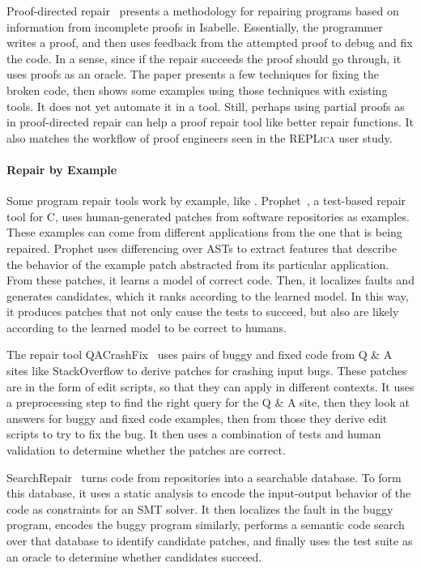 Proof-directed repair~\cite{dennis2006proof} presents a methodology
for repairing programs based on information from incomplete proofs in Isabelle.
Essentially, the programmer writes a proof, and then uses feedback
from the attempted proof to debug and fix the code.
In a sense, since if the repair succeeds the proof should go through,
it uses proofs as an oracle. The paper presents a few techniques for fixing the broken code,
then shows some examples using those techniques with existing tools.
It does not yet automate it in a tool.
Still, perhaps using partial proofs as in proof-directed repair can help a proof repair tool like \sysnamelong
better repair functions.
It also matches the workflow of proof engineers seen in the \textsc{REPLica} user study. %

\paragraph{Repair by Example}
Some program repair tools work by example, like \sysnamelong.
Prophet~\cite{Long:2016:APG:2837614.2837617}, a test-based repair tool for C,
uses human-generated patches from software repositories as examples.
These examples can come from different applications from the one that is being repaired.
Prophet uses differencing over ASTs %
to extract features that describe the behavior of the example patch abstracted from its particular application.
From these patches, it learns a model of correct code. Then,
it localizes faults and generates candidates, which it ranks according to the learned model.
In this way, it produces patches that not only cause the tests to succeed, but also
are likely according to the learned model to be correct to humans.

The repair tool QACrashFix~\cite{gao2015fixing} uses pairs of buggy and fixed code from Q \& A sites like
StackOverflow to derive patches for crashing input bugs. These patches are in the form of edit scripts,
so that they can apply in different contexts. %
It uses a preprocessing step to find the right query for the Q \& A site, then they
look at answers for buggy and fixed code examples, then from those they derive edit scripts to try to fix the bug.
It then uses a combination of tests and human validation to determine whether the patches are correct.

SearchRepair~\cite{Ke:2015:RPS:2916135.2916260} turns code from repositories into a searchable database.
To form this database, it uses a static analysis to encode the input-output behavior of the code as constraints for an SMT solver.
It then localizes the fault in the buggy program,
encodes the buggy program similarly, performs a semantic code search over that database to identify candidate patches,
and finally uses the test suite as an oracle to determine whether candidates succeed.

